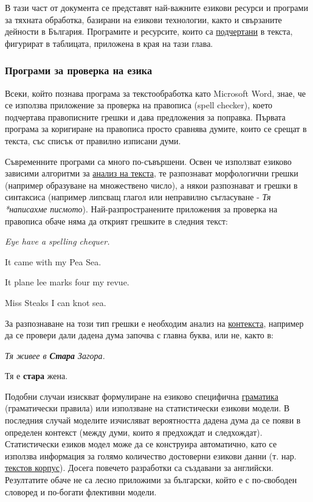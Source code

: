 \begin{multicols}{2}
В тази част от документа се представят най-важните езикови ресурси и програми за тяхната обработка, базирани на езикови технологии, както и свързаните дейности в България. Програмите и ресурсите, които са \uline{подчертани} в текста, фигурират в таблицата, приложена в края на тази глава.  



\subsubsection{Програми за проверка на езика}

Всеки, който познава програма за текстообработка като Microsoft Word, знае, че се използва приложение за проверка на правописа (spell checker), което подчертава правописните грешки и дава предложения за поправка. Първата програма за коригиране на правописа просто сравнява думите, които се срещат в текста, със списък от правилно изписани думи. 

Съвременните програми са много по-съвършени. Освен че използват езиково зависими алгоритми за \uline{анализ на текста}, те разпознават морфологични грешки (например образуване на множествено число), а някои разпознават и грешки в синтаксиса (например липсващ глагол или неправилно съгласуване - {\it Тя *написахме писмото}). Най-разпространените приложения за проверка на правописа обаче няма да открият грешките в следния текст: 

{\it
\hspace{0.5cm}Eye have a spelling chequer.

\hspace{0.5cm}It came with my Pea Sea.

\hspace{0.5cm}It plane lee marks four my revue.

\hspace{0.5cm}Miss Steaks I can knot sea. \cite{zar1}
}

За разпознаване на този тип грешки е необходим анализ на \uline{контекста}, например да се провери дали дадена дума започва с главна буква, или не, както в: 

{\it
\hspace{0.5cm}Тя живее в \textbf{Стара} Загора.

\hspace{0.5cm}Тя е \textbf{стара} жена.
}

Подобни случаи изискват формулиране на езиково специфична \uline{граматика} (граматически правила) или използване на статистически езикови модели. В последния случай моделите изчисляват вероятността дадена дума да се появи в определен контекст (между думи, които я предхождат и следхождат). 
Статистически езиков модел може да се конструира автоматично, като се използва информация за голямо количество достоверни езикови данни (т. нар. \uline{текстов корпус}). Досега повечето разработки са създавани за английски. Резултатите обаче не са лесно приложими за български, който е с по-свободен словоред и по-богати флективни модели. 


\end{multicols}
